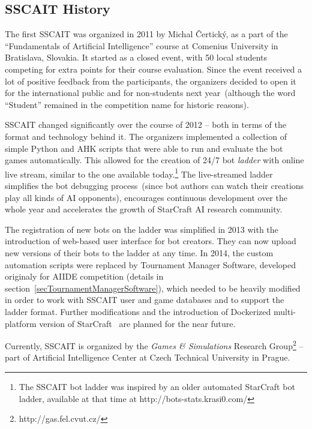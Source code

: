 \subsection{SSCAIT History}

The first SSCAIT was organized in 2011 by Michal \v{C}ertick\'{y}, as a part of the ``Fundamentals of Artificial Intelligence'' course at Comenius University in Bratislava, Slovakia. It started as a closed event, with 50 local students competing for extra points for their course evaluation. Since the event received a lot of positive feedback from the participants, the organizers decided to open it for the international public and for non-students next year~(although the word ``Student'' remained in the competition name for historic reasons). 

SSCAIT changed significantly over the course of 2012 -- both in terms of the format and technology behind it. The organizers implemented a collection of simple Python and AHK scripts that were able to run and evaluate the bot games automatically. This allowed for the creation of 24/7 bot {\em ladder} with online live stream, similar to the one available today.\footnote{The SSCAIT bot ladder was inspired by an older automated StarCraft bot ladder, available at that time at http://bots-stats.krasi0.com/} The live-streamed ladder simplifies the bot debugging process~(since bot authors can watch their creations play all kinds of AI opponents), encourages continuous development over the whole year and accelerates the growth of StarCraft AI research community. 

The registration of new bots on the ladder was simplified in 2013 with the introduction of web-based user interface for bot creators. They can now upload new versions of their bots to the ladder at any time. In 2014, the custom automation scripts were replaced by Tournament Manager Software, developed originaly for AIIDE competition (details in section~\ref{secTournamentManagerSoftware}), which needed to be heavily modified in order to work with SSCAIT user and game databases and to support the ladder format. Further modifications and the introduction of Dockerized multi-platform version of StarCraft~\cite{maly2018multi} are planned for the near future. 

Currently, SSCAIT is organized by the {\em Games \& Simulations} Research Group\footnote{http://gas.fel.cvut.cz/} -- part of Artificial Intelligence Center at Czech Technical University in Prague.

